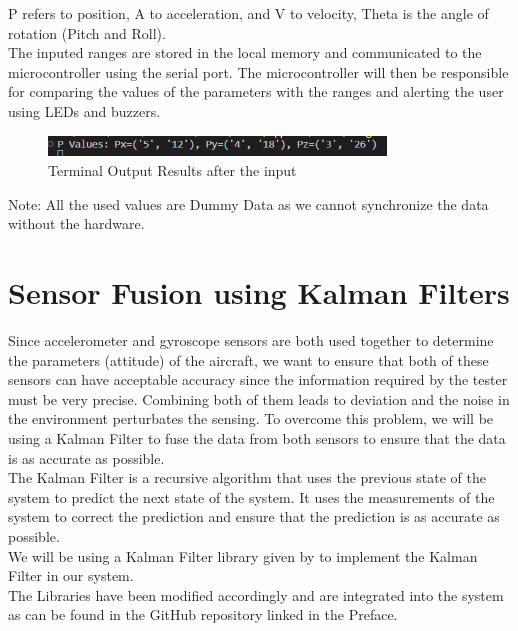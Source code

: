 \documentclass[12pt]{article}
\numberwithin{equation}{section}
\begin{document}
\begin{itemize}
P refers to position, A to acceleration, and V to velocity, Theta is the angle of rotation (Pitch and Roll).\\
  The inputed ranges are stored in the local memory and communicated to the microcontroller using the serial port. The microcontroller will then be responsible for comparing the values of the parameters with the ranges and alerting the user using LEDs and buzzers.
  \begin{figure}[H]
    \centering
    \includegraphics[width=0.8\textwidth]{Figures/ParamResult.png}
    \caption{Terminal Output Results after the input}
  \end{figure}
\end{itemize}
Note: All the used values are Dummy Data as we cannot synchronize the data without the hardware.

\newpage

\section{Sensor Fusion using Kalman Filters}
Since accelerometer and gyroscope sensors are both used together to determine the parameters (attitude) of the aircraft, we want to ensure that both of these sensors can have acceptable accuracy since the information required by the tester must be very precise. Combining both of them leads to deviation and the noise in the environment perturbates the sensing.
To overcome this problem, we will be using a Kalman Filter to fuse the data from both sensors to ensure that the data is as accurate as possible.\\
The Kalman Filter is a recursive algorithm that uses the previous state of the system to predict the next state of the system. It uses the measurements of the system to correct the prediction and ensure that the prediction is as accurate as possible.\\
We will be using a Kalman Filter library given by \cite{KalmanFilter} to implement the Kalman Filter in our system.\\
The Libraries have been modified accordingly and are integrated into the system as can be found in the GitHub repository linked in the Preface.\\
\end{document}
